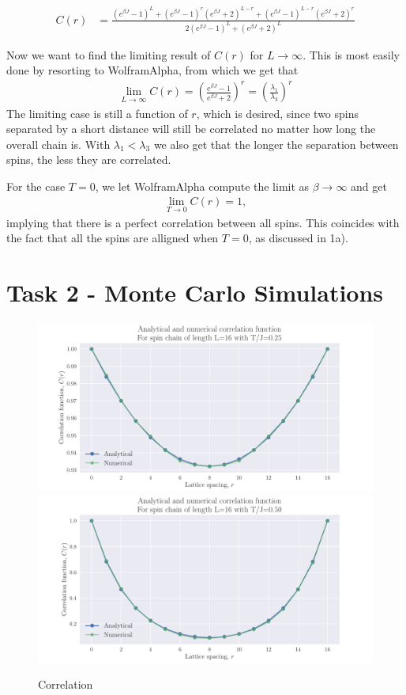 \documentclass[reprint,english,notitlepage,aps,nobalancelastpage,nofootinbib]{revtex4-1}
\newcommand{\closed}[1]{\left(#1\right)}
\newcommand{\ebj}{e^{\beta J}}
\renewcommand{\l}{\lambda}
\begin{document}
\begin{align} \label{eq:corr_func_result}
	C(r) &= \frac{(\ebj-1)^L + (\ebj-1)^r (\ebj+2)^{L-r} + (\ebj-1)^{L-r} (\ebj+2)^r}{2(\ebj-1)^L + (\ebj+2)^L}
\end{align}



Now we want to find the limiting result of $C(r)$ for $L\to\infty$. This is most easily done by resorting to WolframAlpha, from which we get that
\begin{align*}
	\lim_{L\to\infty} C(r) = \closed{\frac{\ebj-1}{\ebj+2}}^r = \closed{\frac{\l_1}{\l_3}}^r
\end{align*}
The limiting case is still a function of $r$, which is desired, since two spins separated by a short distance will still be correlated no matter how long the overall chain is. With $\l_1<\l_3$ we also get that the longer the separation between spins, the less they are correlated. 

For the case $T=0$, we let WolframAlpha compute the limit as $\beta\to\infty$ and get 
\begin{align*}
	\lim_{T\to0} C(r) = 1,
\end{align*}
implying that there is a perfect correlation between all spins. This coincides with the fact that all the spins are alligned when $T=0$, as discussed in 1a). 

\section*{\large Task 2 - Monte Carlo Simulations}


\begin{figure}[h!]
	\centering
	\includegraphics[width=0.7\linewidth]{correlation1D_025.pdf}
	\includegraphics[width=0.7\linewidth]{correlation1D_05.pdf}
	\caption{Correlation}
	\label{fig:correlation}
\end{figure}
\end{document}

